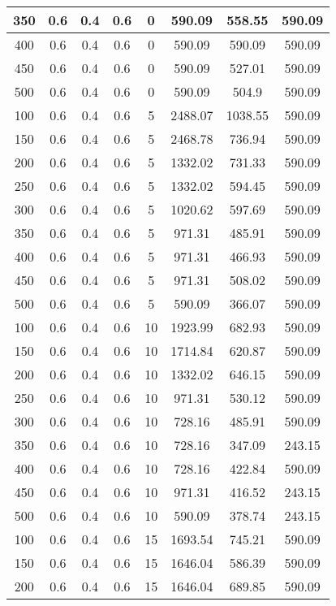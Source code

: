 \documentclass[a4paper, 12pt]{extreport}
\begin{document}
\begin{itemize}
\begin{longtable}{|c|c|c|c|c|c|c|c|}
			350 & 0.6 & 0.4 & 0.6 & 0 & 590.09 & 558.55 & 590.09 \\\hline
			400 & 0.6 & 0.4 & 0.6 & 0 & 590.09 & 590.09 & 590.09 \\\hline
			450 & 0.6 & 0.4 & 0.6 & 0 & 590.09 & 527.01 & 590.09 \\\hline
			500 & 0.6 & 0.4 & 0.6 & 0 & 590.09 & 504.9 & 590.09 \\\hline
			100 & 0.6 & 0.4 & 0.6 & 5 & 2488.07 & 1038.55 & 590.09 \\\hline
			150 & 0.6 & 0.4 & 0.6 & 5 & 2468.78 & 736.94 & 590.09 \\\hline
			200 & 0.6 & 0.4 & 0.6 & 5 & 1332.02 & 731.33 & 590.09 \\\hline
			250 & 0.6 & 0.4 & 0.6 & 5 & 1332.02 & 594.45 & 590.09 \\\hline
			300 & 0.6 & 0.4 & 0.6 & 5 & 1020.62 & 597.69 & 590.09 \\\hline
			350 & 0.6 & 0.4 & 0.6 & 5 & 971.31 & 485.91 & 590.09 \\\hline
			400 & 0.6 & 0.4 & 0.6 & 5 & 971.31 & 466.93 & 590.09 \\\hline
			450 & 0.6 & 0.4 & 0.6 & 5 & 971.31 & 508.02 & 590.09 \\\hline
			500 & 0.6 & 0.4 & 0.6 & 5 & 590.09 & 366.07 & 590.09 \\\hline
			100 & 0.6 & 0.4 & 0.6 & 10 & 1923.99 & 682.93 & 590.09 \\\hline
			150 & 0.6 & 0.4 & 0.6 & 10 & 1714.84 & 620.87 & 590.09 \\\hline
			200 & 0.6 & 0.4 & 0.6 & 10 & 1332.02 & 646.15 & 590.09 \\\hline
			250 & 0.6 & 0.4 & 0.6 & 10 & 971.31 & 530.12 & 590.09 \\\hline
			300 & 0.6 & 0.4 & 0.6 & 10 & 728.16 & 485.91 & 590.09 \\\hline
			350 & 0.6 & 0.4 & 0.6 & 10 & 728.16 & 347.09 & 243.15 \\\hline
			400 & 0.6 & 0.4 & 0.6 & 10 & 728.16 & 422.84 & 590.09 \\\hline
			450 & 0.6 & 0.4 & 0.6 & 10 & 971.31 & 416.52 & 243.15 \\\hline
			500 & 0.6 & 0.4 & 0.6 & 10 & 590.09 & 378.74 & 243.15 \\\hline
			100 & 0.6 & 0.4 & 0.6 & 15 & 1693.54 & 745.21 & 590.09 \\\hline
			150 & 0.6 & 0.4 & 0.6 & 15 & 1646.04 & 586.39 & 590.09 \\\hline
			200 & 0.6 & 0.4 & 0.6 & 15 & 1646.04 & 689.85 & 590.09 \\\hline

\end{longtable}
\end{itemize}
\end{document}
